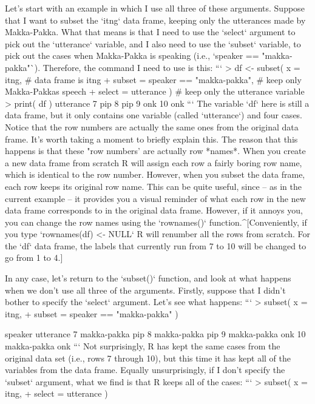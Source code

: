Let's start with an example in which I use all three of these arguments. Suppose that I want to subset the `itng` data frame, keeping only the utterances made by Makka-Pakka. What that means is that I need to use the `select` argument to pick out the `utterance` variable, and I also need to use the `subset` variable, to pick out the cases when Makka-Pakka is speaking (i.e., `speaker == "makka-pakka"`). Therefore, the command I need to use is this:
```
> df <- subset( x = itng,                            # data frame is itng
+               subset = speaker == "makka-pakka",   # keep only Makka-Pakkas speech
+               select = utterance )                 # keep only the utterance variable
> print( df )
   utterance
7        pip
8        pip
9        onk
10       onk
```
The variable `df` here is still a data frame, but it only contains one variable (called `utterance`) and four cases. Notice that the row numbers are actually the same ones from the original data frame. It's worth taking a moment to briefly explain this. The reason that this happens is that these "row numbers' are actually row *names*. When you create a new data frame from scratch R will assign each row a fairly boring row name, which is identical to the row number. However, when you subset the data frame, each row keeps its original row name. This can be quite useful, since -- as in the current example -- it provides you a visual reminder of what each row in the new data frame corresponds to in the original data frame. However, if it annoys you, you can change the row names using the `rownames()` function.^[Conveniently, if you type `rownames(df) <- NULL` R will renumber all the rows from scratch. For the `df` data frame, the labels that currently run from 7 to 10 will be changed to go from 1 to 4.]

In any case, let's return to the `subset()` function, and look at what happens when we don't use all three of the arguments. Firstly, suppose that I didn't bother to specify the `select` argument. Let's see what happens:
```
> subset( x = itng,
+         subset = speaker == "makka-pakka" )

       speaker utterance
7  makka-pakka       pip
8  makka-pakka       pip
9  makka-pakka       onk
10 makka-pakka       onk
```
Not surprisingly, R has kept the same cases from the original data set (i.e., rows 7 through 10), but this time it has kept all of the variables from the data frame. Equally unsurprisingly, if I don't specify the `subset` argument, what we find is that R keeps all of the cases:
```
> subset( x = itng, 
+         select = utterance )

